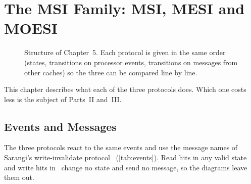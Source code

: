 \chapter{The MSI Family: MSI, MESI and MOESI}
\label{ch:msi-family}
%

\begin{figure}[htbp]
\centering
{}
\caption[]{Structure of Chapter~5. Each protocol is given
in the same order (states, transitions on processor events, transitions on
messages from other caches) so the three can be compared line by line.}
\label{fig:ch5-map}
\end{figure}

This chapter describes what each of the three protocols does. Which one costs
less is the subject of Parts~II and~III.

\section{Events and Messages}
\label{sec:fam-events}
%

The three protocols react to the same events and use the message names of
Sarangi's write-invalidate protocol~\cite[\S12.4.6]{sarangi2025basic}
(\cref{tab:events}). Read hits in any valid state and write hits in \stM\ change
no state and send no message, so the diagrams leave them out.

